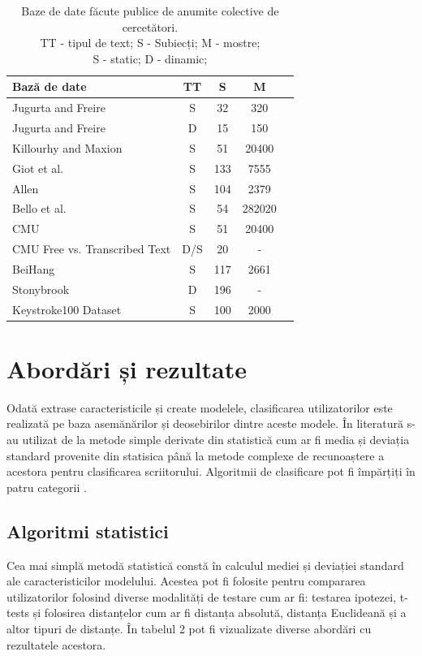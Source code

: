 \documentclass[9pt,shortpaper,twoside,web]{ieeecolor}
\begin{document}
\begin{table}[H]
	\begin{tabular}[c]{lcccc}
	\hline
	Bază de date 							 & TT  &  S &       M \\
	
	\hline
	Jugurta and Freire   \cite{b8}      		   & S   & 32 &    320 \\ 
	Jugurta and Freire   \cite{b8}      		   & D   & 15 &    150 \\ 
	Killourhy and Maxion \cite{b9}      		   & S   & 51 &  20400 \\ 
	Giot et al.			 \cite{b10}	    	 	   & S   &133 &   7555 \\ 
	Allen				 \cite{b11}	    	 	   & S   &104 &   2379 \\ 
	Bello et al.		 \cite{b12}	    	 	   & S   & 54 & 282020 \\ 
	CMU \cite{b13}  					 	 	   & S   & 51 &  20400 \\
	CMU Free vs. Transcribed Text \cite{b14} 	   & D/S & 20 & 	 - \\
	BeiHang \cite{b15}						 	   & S   &117 &   2661 \\
	Stonybrook  \cite{b16}					 	   & D   &196 & 	 - \\
	Keystroke100 Dataset \cite{b17, b18}           & S   &100 &	  2000 \\
	\hline
	\end{tabular}
	
\caption{ 
Baze de date făcute publice de anumite colective de cercetători.
\\
TT - tipul de text; S - Subiecți; M - mostre;
\\
S - static; D - dinamic;
}
\end{table}

\section{Abordări și rezultate}
	Odată extrase caracteristicile și create modelele, clasificarea utilizatorilor este realizată pe baza asemănărilor și deosebirilor dintre aceste modele. În literatură s-au utilizat de la metode simple derivate din statistică cum ar fi media și deviația standard provenite din statisica până la metode complexe de recunoaștere a acestora pentru clasificarea scriitorului. Algoritmii de clasificare pot fi împărțiți în patru categorii \cite{b3}.

\subsection{Algoritmi statistici}
	Cea mai simplă metodă statistică constă în calculul mediei și deviației standard ale caracteristicilor modelului. Acestea pot fi folosite pentru compararea utilizatorilor folosind diverse modalități de testare cum ar fi: testarea ipotezei, t-tests și folosirea distanțelor cum ar fi distanța absolută, distanța Euclideană și a altor tipuri de distanțe. În tabelul 2 pot fi vizualizate diverse abordări cu rezultatele acestora.
\\
\end{document}
